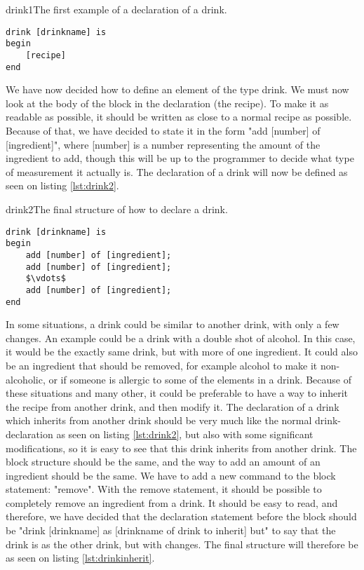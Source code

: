 \begin{code}{drink1}{The first example of a declaration of a drink.}
\begin{lstlisting}
drink [drinkname] is
begin
	[recipe]
end
\end{lstlisting}
\end{code}

We have now decided how to define an element of the type drink. We must now look at the body of the block in the declaration (the recipe). To make it as readable as possible, it should be written as close to a normal recipe as possible. Because of that, we have decided to state it in the form "add [number] of [ingredient]", where [number] is a number representing the amount of the ingredient to add, though this will be up to the programmer to decide what type of measurement it actually is. The declaration of a drink will now be defined as seen on listing \ref{lst:drink2}.

\begin{code}{drink2}{The final structure of how to declare a drink.}
\begin{lstlisting}[mathescape]
drink [drinkname] is
begin
	add [number] of [ingredient];
	add [number] of [ingredient];
	$\vdots$
	add [number] of [ingredient];
end
\end{lstlisting}
\end{code}

In some situations, a drink could be similar to another drink, with only a few changes. An example could be a drink with a double shot of alcohol. In this case, it would be the exactly same drink, but with more of one ingredient. It could also be an ingredient that should be removed, for example alcohol to make it non-alcoholic, or if someone is allergic to some of the elements in a drink. Because of these situations and many other, it could be preferable to have a way to inherit the recipe from another drink, and then modify it. The declaration of a drink which inherits from another drink should be very much like the normal drink-declaration as seen on listing \ref{lst:drink2}, but also with some significant modifications, so it is easy to see that this drink inherits from another drink. The block structure should be the same, and the way to add an amount of an ingredient should be the same. We have to add a new command to the block statement: "remove". With the remove statement, it should be possible to completely remove an ingredient from a drink. It should be easy to read, and therefore, we have decided that the declaration statement before the block should be "drink [drinkname] as [drinkname of drink to inherit] but" to say that the drink is as the other drink, but with changes. The final structure will therefore be as seen on listing \ref{lst:drinkinherit}.

